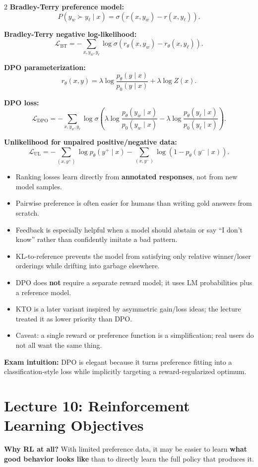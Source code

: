 \documentclass[10pt]{article}
\begin{document}
\begin{multicols*}{2}
\textbf{Bradley-Terry preference model:}
\[
P(y_w \succ y_\ell \mid x)
=
\sigma\!\left(r(x,y_w)-r(x,y_\ell)\right).
\]

\textbf{Bradley-Terry negative log-likelihood:}
\[
\mathcal{L}_{\mathrm{BT}}
=
-\sum_{x,y_w,y_\ell}
\log \sigma\!\left(r_\theta(x,y_w)-r_\theta(x,y_\ell)\right).
\]

\textbf{DPO parameterization:}
\[
r_\theta(x,y)
=
\lambda \log \frac{p_\theta(y \mid x)}{p_0(y \mid x)}
+ \lambda \log Z(x).
\]

\textbf{DPO loss:}
\[
\mathcal{L}_{\mathrm{DPO}}
=
-\sum_{x,y_w,y_\ell}
\log \sigma\!\left(
\lambda \log \frac{p_\theta(y_w \mid x)}{p_0(y_w \mid x)}
-
\lambda \log \frac{p_\theta(y_\ell \mid x)}{p_0(y_\ell \mid x)}
\right).
\]

\textbf{Unlikelihood for unpaired positive/negative data:}
\[
\mathcal{L}_{\mathrm{UL}}
=
-\sum_{(x,y^+)} \log p_\theta(y^+ \mid x)
-\sum_{(x,y^-)} \log \left(1-p_\theta(y^- \mid x)\right).
\]

\begin{itemize}
\item Ranking losses learn directly from \textbf{annotated responses}, not from new model samples.
\item Pairwise preference is often easier for humans than writing gold answers from scratch.
\item Feedback is especially helpful when a model should abstain or say ``I don't know'' rather than confidently imitate a bad pattern.
\item KL-to-reference prevents the model from satisfying only relative winner/loser orderings while drifting into garbage elsewhere.
\item DPO does \textbf{not} require a separate reward model; it uses LM probabilities plus a reference model.
\item KTO is a later variant inspired by asymmetric gain/loss ideas; the lecture treated it as lower priority than DPO.
\item Caveat: a single reward or preference function is a simplification; real users do not all want the same thing.
\end{itemize}

\textbf{Exam intuition:} DPO is elegant because it turns preference fitting into a classification-style loss while implicitly targeting a reward-regularized optimum.

\section*{Lecture 10: Reinforcement Learning Objectives}
\textbf{Why RL at all?} With limited preference data, it may be easier to learn \textbf{what good behavior looks like} than to directly learn the full policy that produces it.


\end{multicols*}
\end{document}
